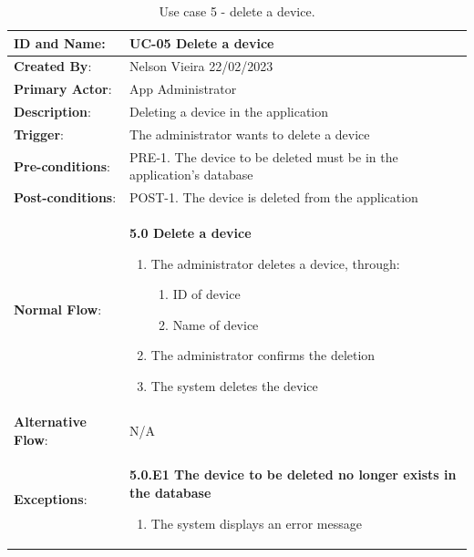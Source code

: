 \begin{table}[H]
    \centering
    \caption{Use case 5 - delete a device.}
    \label{table:use_case5}
    \vspace{1em}
    \begin{adjustbox}{width=1.2\textwidth,center=\textwidth}
        \begin{tabular}{|m{4cm}|m{12cm}|}
            \hline
            \textbf{ID and Name}: & UC-05 Delete a device \\
            \hline
            \textbf{Created By}: & Nelson Vieira 22/02/2023 \\
            \hline
            \textbf{Primary Actor}: & App Administrator \\
            \hline
            \textbf{Description}: & Deleting a device in the application \\
            \hline
            \textbf{Trigger}: & The administrator wants to delete a device \\
            \hline
            \textbf{Pre-conditions}: & PRE-1. The device to be deleted must be in the application's database \\
            \hline
            \textbf{Post-conditions}: & POST-1. The device is deleted from the application \\
            \hline
            \textbf{Normal Flow}: & \textbf{5.0 Delete a device}
            \begin{enumerate}
                \item The administrator deletes a device, through:
                \begin{enumerate}
                    \item ID of device
                    \item Name of device
                \end{enumerate}
                \item The administrator confirms the deletion
                \item The system deletes the device
            \end{enumerate} \\
            \hline
            \textbf{Alternative Flow}: & N/A \\
            \hline
            \textbf{Exceptions}: & \textbf{5.0.E1  The device to be deleted no longer exists in the database}
            \begin{enumerate}
                \item The system displays an error message

\end{enumerate}
\end{tabular}
\end{adjustbox}
\end{table}
